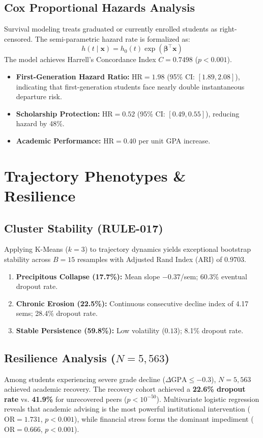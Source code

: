 \documentclass[10pt,journal,compsoc]{IEEEtran}
\begin{document}
\subsection{Cox Proportional Hazards Analysis}
Survival modeling treats graduated or currently enrolled students as right-censored. The semi-parametric hazard rate is formalized as:
\begin{equation}
h(t \mid \mathbf{x}) = h_0(t) \exp\left(\boldsymbol{\beta}^\top \mathbf{x}\right)
\end{equation}
The model achieves Harrell's Concordance Index $C = 0.7498$ ($p < 0.001$).
\begin{itemize}
    \item \textbf{First-Generation Hazard Ratio:} $\text{HR} = 1.98$ (95\% CI: $[1.89, 2.08]$), indicating that first-generation students face nearly double instantaneous departure risk.
    \item \textbf{Scholarship Protection:} $\text{HR} = 0.52$ (95\% CI: $[0.49, 0.55]$), reducing hazard by 48\%.
    \item \textbf{Academic Performance:} $\text{HR} = 0.40$ per unit GPA increase.
\end{itemize}

\section{Trajectory Phenotypes \& Resilience}

\subsection{Cluster Stability (RULE-017)}
Applying K-Means ($k=3$) to trajectory dynamics yields exceptional bootstrap stability across $B=15$ resamples with Adjusted Rand Index (ARI) of $0.9703$. 
\begin{enumerate}
    \item \textbf{Precipitous Collapse (17.7\%):} Mean slope $-0.37$/sem; 60.3\% eventual dropout rate.
    \item \textbf{Chronic Erosion (22.5\%):} Continuous consecutive decline index of 4.17 sems; 28.4\% dropout rate.
    \item \textbf{Stable Persistence (59.8\%):} Low volatility ($0.13$); 8.1\% dropout rate.
\end{enumerate}

\subsection{Resilience Analysis ($N=5,563$)}
Among students experiencing severe grade decline ($\Delta\text{GPA} \le -0.3$), $N = 5,563$ achieved academic recovery. The recovery cohort achieved a \textbf{22.6\% dropout rate} vs. \textbf{41.9\%} for unrecovered peers ($p < 10^{-50}$).
Multivariate logistic regression reveals that academic advising is the most powerful institutional intervention ($\text{OR} = 1.731$, $p < 0.001$), while financial stress forms the dominant impediment ($\text{OR} = 0.666$, $p < 0.001$).
\end{document}
